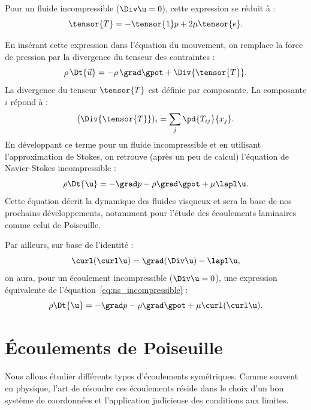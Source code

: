 \begin{redmargin}
Pour un fluide incompressible ($\Div \u = 0$), cette expression se réduit à :
\begin{equation}
  \tensor{T} = - \tensor{1}p + 2 \mu \tensor{e}.
  \label{eq:tenseur_contraintes_stokes_incompressible}
\end{equation}

En insérant cette expression dans l'équation du mouvement, on remplace la force de pression par la divergence du tenseur des contraintes :
\begin{equation}
  \rho \, \Dt{\vec{u}} = - \rho \, \grad \gpot + \Div{\tensor{T}}.
  \label{eq:ns}
\end{equation}
La divergence du tenseur $\tensor{T}$ est définie par composante. La composante $i$ répond à :
\begin{displaymath}
  (\Div{\tensor{T}})_i = \sum_j \pd{T_{ij}}{x_j}.
\end{displaymath}
En développant ce terme pour un fluide incompressible et en utilisant l'approximation de Stokes, on retrouve (après un peu de calcul) l'équation de Navier-Stokes incompressible :
\begin{equation}
  \rho \Dt{\u} = -\grad p - \rho \grad \gpot + \mu \lapl \u.
  \label{eq:ns_incompressible}
\end{equation}
Cette équation décrit la dynamique des fluides visqueux et sera la base de nos prochains développements, notamment pour l'étude des écoulements laminaires comme celui de Poiseuille.

Par ailleurs, sur base de l'identité :
\begin{displaymath}
  \curl(\curl \u) = \grad(\Div \u) - \lapl \u,
\end{displaymath}
on aura, pour un écoulement incompressible ($\Div \u = 0$), une expression équivalente de l'équation~\eqref{eq:ns_incompressible} :
\begin{equation}
  \rho \Dt{\u} = -\grad p - \rho \grad \gpot + \mu \curl(\curl \u).
  \label{eq:ns_incompressible_bis}
\end{equation}
\end{redmargin}

\section{Écoulements de Poiseuille}

Nous allons étudier différents types d'écoulements symétriques. Comme souvent en physique, l'art de résoudre ces écoulements réside dans le choix d'un bon système de coordonnées et l'application judicieuse des conditions aux limites.


